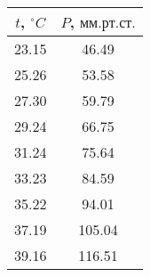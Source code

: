 \begin{tabular}{c|c}
\toprule
$t$, $^\circ C$ & $P$, $мм. рт. ст.$ \\
\midrule
23.15 & 46.49 \\
25.26 & 53.58 \\
27.30 & 59.79 \\
29.24 & 66.75 \\
31.24 & 75.64 \\
33.23 & 84.59 \\
35.22 & 94.01 \\
37.19 & 105.04 \\
39.16 & 116.51 \\
\bottomrule
\end{tabular}
